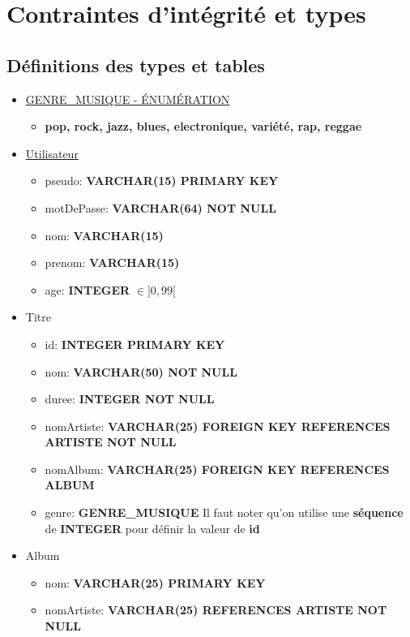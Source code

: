 \documentclass[a4paper,12pt, french]{report}
\begin{document}
\section{Contraintes d'intégrité et types}
  \subsection{Définitions des types et tables}
    \begin{itemize}
      \item \underline{GENRE\_MUSIQUE - ÉNUMÉRATION}
        \begin{itemize}
          \item \textbf{pop, rock, jazz, blues, electronique, variété, rap, reggae}
        \end{itemize}
      \item \underline{Utilisateur}
        \begin{itemize}
          \item pseudo: \textbf{VARCHAR(15) PRIMARY KEY}
          \item motDePasse: \textbf{VARCHAR(64) NOT NULL}
          \item nom: \textbf{VARCHAR(15)}
          \item prenom: \textbf{VARCHAR(15)}
          \item age: \textbf{INTEGER} $\in ]0, 99[$
        \end{itemize}
      \item Titre
        \begin{itemize}
          \item id: \textbf{INTEGER PRIMARY KEY}
          \item nom: \textbf{VARCHAR(50) NOT NULL}
          \item duree: \textbf{INTEGER NOT NULL}
          \item nomArtiste: \textbf{VARCHAR(25) FOREIGN KEY REFERENCES ARTISTE NOT NULL}
          \item nomAlbum: \textbf{VARCHAR(25) FOREIGN KEY REFERENCES ALBUM}
          \item genre: \textbf{GENRE\_MUSIQUE}
          Il faut noter qu'on utilise une \textbf{séquence} de \textbf{INTEGER} pour définir la valeur de \textbf{id}
        \end{itemize}
      \item Album
        \begin{itemize}
          \item nom: \textbf{VARCHAR(25) PRIMARY KEY}
          \item nomArtiste: \textbf{VARCHAR(25) REFERENCES ARTISTE NOT NULL}

\end{itemize}
\end{itemize}
\end{document}
